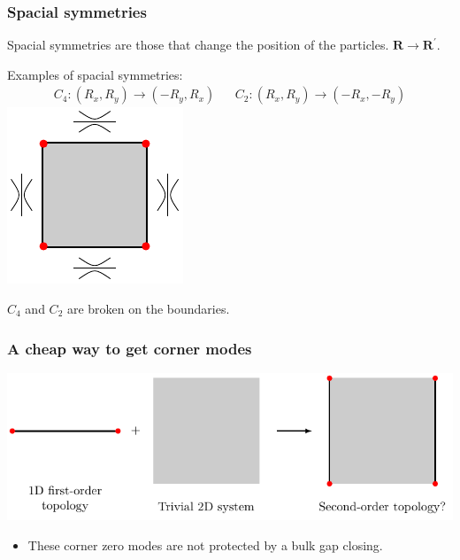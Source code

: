 \documentclass{beamer}
\renewcommand{\(}{\left(}
\renewcommand{\)}{\right)}
\renewcommand{\[}{\left[}
\renewcommand{\]}{\right]}
\begin{document}
\begin{frame}
    \frametitle{Spacial symmetries}

    \begin{framed}
        Spacial symmetries are those that change the position of the particles. $\bm R \rightarrow \bm R^\prime$.
    \end{framed}
    Examples of spacial symmetries: 
    \begin{align*}
        C_4 : (R_x, R_y) \rightarrow (-R_y, R_x) && C_2 : (R_x, R_y) \rightarrow (-R_x, -R_y)
    \end{align*}
    \centering
    \includegraphics[]{second_order_surface.pdf}

    $C_4$ and $C_2$ are broken on the boundaries.  
\end{frame}

\begin{frame}
    \frametitle{A cheap way to get corner modes}
    \begin{center}
        \includegraphics[scale=0.85]{cheap_corner.pdf}
    \end{center}
    \begin{itemize}
        \item These corner zero modes are not protected by a bulk gap closing. 
    \end{itemize}

\end{frame}
\end{document}
